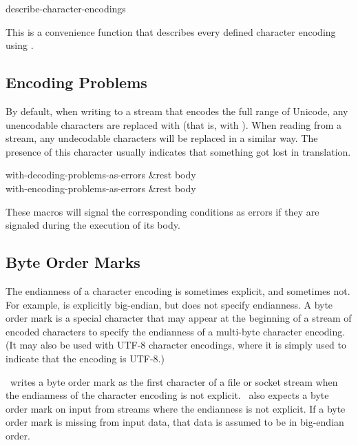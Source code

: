 \begin{defun}[Function]
describe-character-encodings

This is a convenience function that describes every defined character
encoding using .
\end{defun}

\subsection{Encoding Problems}

By default, when writing to a stream that encodes the full range of
Unicode, any unencodable characters are replaced with
 (that is, with ).
When reading from a stream, any undecodable characters will
be replaced in a similar way.  The presence of this character usually
indicates that something got lost in translation.


\begin{defun}[Macro]
with-decoding-problems-as-errors &rest body \\
with-encoding-problems-as-errors &rest body 

These macros will signal the corresponding conditions as errors
if they are signaled during the execution of its body.
\end{defun}


\subsection{Byte Order Marks}

The endianness of a character encoding is sometimes explicit, and
sometimes not. For example,  is explicitly big-endian,
but  does not specify endianness. A byte order mark is a
special character that may appear at the beginning of a stream of
encoded characters to specify the endianness of a multi-byte character
encoding. (It may also be used with UTF-8 character encodings, where
it is simply used to indicate that the encoding is UTF-8.)

\CCL\ writes a byte order mark as the first character of a file or
socket stream when the endianness of the character encoding is not
explicit. \CCL\ also expects a byte order mark on input from
streams where the endianness is not explicit. If a byte order mark is
missing from input data, that data is assumed to be in big-endian
order.

